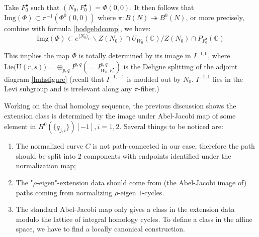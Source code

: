 \documentclass[12pt, letterpaper]{amsart}
\theoremstyle{plain}
\theoremstyle{definition}
\begin{document}
Take $F_0^{\bullet}$ such that $(N_0, F_0^{\bullet})=\Phi(0,0)$. It then follows that $\mathrm{Img}(\Phi)\subset \pi^{-1}(\Phi^0(0,0))$ where 
$\pi: B(N)\twoheadrightarrow B^0(N)$, 
or more precisely, combine with formula \ref{hodgebdcomp}, we have:
\begin{equation}
\mathrm{Img}(\Phi)\subset e^{\langle N_0\rangle_{\mathbb{C}}} \backslash Z(N_0)\cap U_{W_0}(\mathbb{C}) /Z(N_0)\cap P_{F_0^{\bullet}}(\mathbb{C})
\end{equation}

This implies the map $\Phi$ is totally determined by its image in $I^{-1,0}$, where $\mathrm{Lie(U}(r,s))=\oplus_{p,q}I^{p,q}(=I^{p,q}_{W_0, F_0^{\bullet}})$ is the Deligne splitting of the adjoint diagram \ref{lmhsfigure} (recall that $I^{-1,-1}$ is modded out by $N_0$. $I^{-1,1}$ lies in the Levi subgroup and is irrelevant along any $\pi$-fiber.)

Working on the dual homology sequence, the previous discussion shows the extension class is determined by the image under Abel-Jacobi map of some element in $H^0(\{q_{j,i}\})[-1], i=1,2$. Several things to be noticed are:

\begin{enumerate}
    \item The normalized curve $C$ is not path-connected in our case, therefore the path should be split into $2$ components with endpoints identified under the normalization map;
    \item The "$\rho$-eigen"-extension data should come from (the Abel-Jacobi image of) paths coming from normalizing $\rho$-eigen $1$-cycles.
    \item The standard Abel-Jacobi map only gives a class in the extension data modulo the lattice of integral homology cycles. To define a class in the affine space, we have to find a locally canonical construction.
\end{enumerate}
\end{document}
